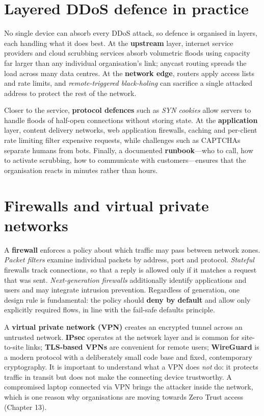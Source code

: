 \documentclass[11pt,openany]{book}
\begin{document}
\section{Layered DDoS defence in practice}\label{sec:6.4}
No single device can absorb every DDoS attack, so defence is organised in layers, each handling what it does best. At the \textbf{upstream} layer, internet service providers and cloud scrubbing services absorb volumetric floods using capacity far larger than any individual organisation's link; anycast routing spreads the load across many data centres. At the \textbf{network edge}, routers apply access lists and rate limits, and \emph{remote-triggered black-holing} can sacrifice a single attacked address to protect the rest of the network.

Closer to the service, \textbf{protocol defences} such as \emph{SYN cookies} allow servers to handle floods of half-open connections without storing state. At the \textbf{application} layer, content delivery networks, web application firewalls, caching and per-client rate limiting filter expensive requests, while challenges such as CAPTCHAs separate humans from bots. Finally, a documented \textbf{runbook}—who to call, how to activate scrubbing, how to communicate with customers—ensures that the organisation reacts in minutes rather than hours.

\section{Firewalls and virtual private networks}\label{sec:6.5}
A \textbf{firewall} enforces a policy about which traffic may pass between network zones. \emph{Packet filters} examine individual packets by address, port and protocol. \emph{Stateful} firewalls track connections, so that a reply is allowed only if it matches a request that was sent. \emph{Next-generation firewalls} additionally identify applications and users and may integrate intrusion prevention. Regardless of generation, one design rule is fundamental: the policy should \textbf{deny by default} and allow only explicitly required flows, in line with the fail-safe defaults principle.

A \textbf{virtual private network (VPN)} creates an encrypted tunnel across an untrusted network. \textbf{IPsec} operates at the network layer and is common for site-to-site links; \textbf{TLS-based VPNs} are convenient for remote users; \textbf{WireGuard} is a modern protocol with a deliberately small code base and fixed, contemporary cryptography. It is important to understand what a VPN does \emph{not} do: it protects traffic in transit but does not make the connecting device trustworthy. A compromised laptop connected via VPN brings the attacker inside the network, which is one reason why organisations are moving towards Zero Trust access (Chapter 13).
\end{document}
